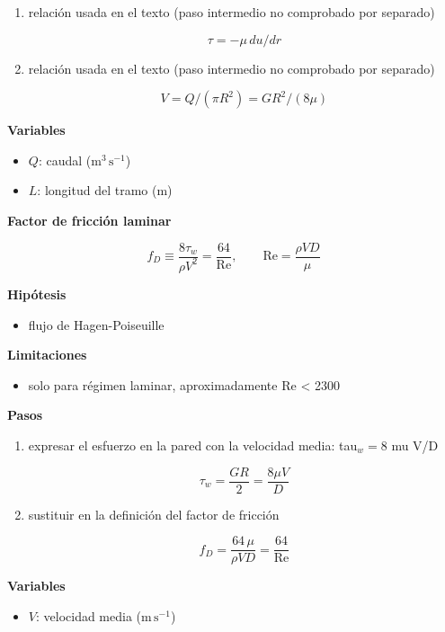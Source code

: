 \documentclass[10pt,openany]{book}
\begin{document}
\begin{tcolorbox}[title={Desarrollos del modelo}, studiumdef, breakable]
\begin{enumerate}
\[
Q = \int_0^{R} u\,2\pi r\,dr = \frac{\pi G R^{4}}{8\mu}
\]
\item
relación usada en el texto (paso intermedio no comprobado por separado)

\[
\tau = -\mu\,du/dr
\]
\item
relación usada en el texto (paso intermedio no comprobado por separado)

\[
V = Q/(\pi R^{2}) = G R^{2}/(8\mu)
\]
\end{enumerate}

\noindent\textbf{Variables}
\begin{itemize}
\item $Q$: caudal ($\mathrm{m}^{3}\,\mathrm{s}^{-1}$)
\item $L$: longitud del tramo ($\mathrm{m}$)
\end{itemize}



\noindent\textbf{Factor de fricción laminar}

\begin{equation}
f_D \equiv \frac{8\tau_w}{\rho V^{2}} = \frac{64}{\mathrm{Re}},\qquad \mathrm{Re} = \frac{\rho V D}{\mu}
\label{eq:c06-factor-laminar}
\end{equation}

\noindent\textbf{Hipótesis}
\begin{itemize}
\item flujo de Hagen-Poiseuille
\end{itemize}

\noindent\textbf{Limitaciones}
\begin{itemize}
\item solo para régimen laminar, aproximadamente Re < 2300
\end{itemize}

\noindent\textbf{Pasos}
\begin{enumerate}
\item
expresar el esfuerzo en la pared con la velocidad media: tau\(_w = 8\) mu V/D

\[
\tau_w = \frac{G R}{2} = \frac{8\mu V}{D}
\]
\item
sustituir en la definición del factor de fricción

\[
f_D = \frac{64\,\mu}{\rho V D} = \frac{64}{\mathrm{Re}}
\]
\end{enumerate}

\noindent\textbf{Variables}
\begin{itemize}
\item $V$: velocidad media ($\mathrm{m}\,\mathrm{s}^{-1}$)
\end{itemize}




\end{tcolorbox}
\end{document}
